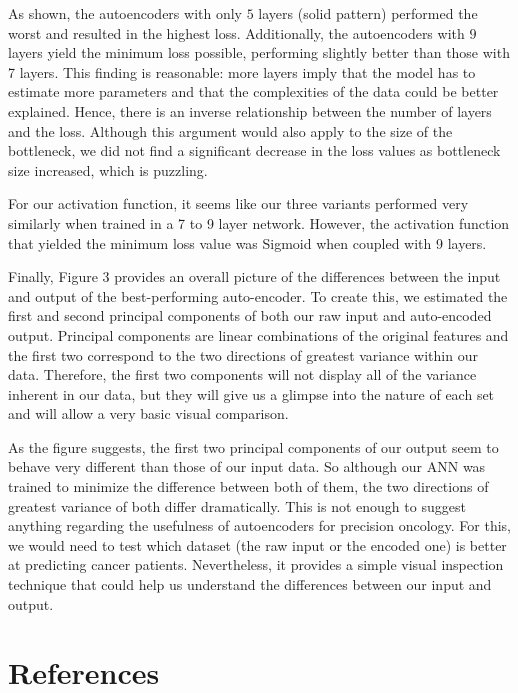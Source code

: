 \documentclass{article}
\begin{document}
As shown, the autoencoders with only $5$ layers (solid pattern) performed the worst and resulted in the highest loss. Additionally, the autoencoders with $9$ layers yield the minimum loss possible, performing slightly better than those with 7 layers. This finding is reasonable: more layers imply that the model has to estimate more parameters and that the complexities of the data could be better explained. Hence, there is an inverse relationship between the number of layers and the loss. Although this argument would also apply to the size of the bottleneck, we did not find a significant decrease in the loss values as bottleneck size increased, which is puzzling. 

For our activation function, it seems like our three variants performed very similarly when trained in a 7 to 9 layer network. However, the activation function that yielded the minimum loss value was Sigmoid when coupled with 9 layers.

Finally, Figure 3 provides an overall picture of the differences between the input and output of the best-performing auto-encoder. To create this, we estimated the first and second principal components of both our raw input and auto-encoded output. Principal components are linear combinations of the original features and the first two correspond to the two directions of greatest variance within our data. Therefore, the first two components will not display all of the variance inherent in our data, but they will give us a glimpse into the nature of each set and will allow a very basic visual comparison.


As the figure suggests, the first two principal components of our output seem to behave very different than those of our input data. So although our ANN was trained to minimize the difference between both of them, the two directions of greatest variance of both differ dramatically. This is not enough to suggest anything regarding the usefulness of autoencoders for precision oncology. For this, we would need to test which dataset (the raw input or the encoded one) is better at predicting cancer patients. Nevertheless, it provides a simple visual inspection technique that could help us understand the differences between our input and output.

\newpage 

\section*{References}
\end{document}
